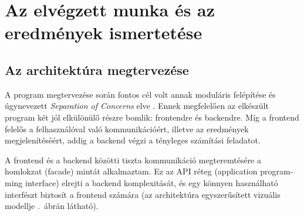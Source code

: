 \documentclass[a4paper,oneside,12pt]{article}
\begin{document}
\section{Az elvégzett munka és az eredmények ismertetése}
\label{sec:az-elvegzett-munka}

\subsection{Az architektúra megtervezése}
\label{sec:az-arch-megterv}

A program megtervezése során fontos cél volt annak moduláris felépítése
és úgynevezett \emph{\foreignlanguage{english}{Separation of Concerns}} elve \cite{readeElementsFunctionalProgramming1989}. Ennek megfelelően az elkészült program két jól elkülönülő részre bomlik: frontendre és backendre. Míg a frontend felelős a felhasználóval való kommunikációért, illetve az eredmények megjelenítéséért, addig a backend végzi a tényleges számítási feladatot.

A frontend és a backend közötti tiszta kommunikáció megteremtésére
a homlokzat (facade) mintát \cite{gammaDesignPatternsElements1995} alkalmaztam. Ez az API réteg (\foreignlanguage{english}{application programming interface}) elrejti a backend komplexitását, és egy könnyen használható interfészt biztosít a frontend számára (az architektúra egyszerűsített vizuális modellje .~ábrán látható).
\end{document}
